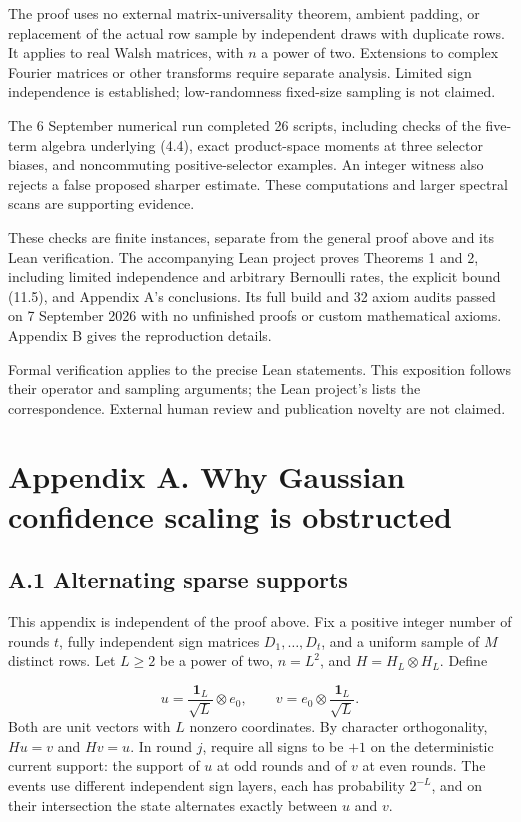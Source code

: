 \documentclass[11pt,a4paper]{article}
\begin{document}
The proof uses no external matrix-universality theorem, ambient padding, or replacement of the actual row sample by independent draws with duplicate rows. It applies to real Walsh matrices, with \(n\) a power of two. Extensions to complex Fourier matrices or other transforms require separate analysis. Limited sign independence is established; low-randomness fixed-size sampling is not claimed.

The 6 September numerical run completed 26 scripts, including checks of the five-term algebra underlying (4.4), exact product-space moments at three selector biases, and noncommuting positive-selector examples. An integer witness also rejects a false proposed sharper estimate. These computations and larger spectral scans are supporting evidence.

These checks are finite instances, separate from the general proof above and its Lean verification. The accompanying Lean project proves Theorems 1 and 2, including limited independence and arbitrary Bernoulli rates, the explicit bound (11.5), and Appendix A's conclusions. Its full build and 32 axiom audits passed on 7 September 2026 with no unfinished proofs or custom mathematical axioms. Appendix B gives the reproduction details.

Formal verification applies to the precise Lean statements. This exposition follows their operator and sampling arguments; the Lean project's  lists the correspondence. External human review and publication novelty are not claimed.

\section*{Appendix A. Why Gaussian confidence scaling is obstructed}
\subsection*{A.1 Alternating sparse supports}
This appendix is independent of the proof above. Fix a positive integer number of rounds \(t\), fully independent sign matrices \(D_1,\ldots,D_t\), and a uniform sample of \(M\) distinct rows. Let \(L\ge2\) be a power of two, \(n=L^2\), and \(H=H_L\otimes H_L\). Define

\begin{equation}
u=\frac{\mathbf1_L}{\sqrt L}\otimes e_0,\qquad
v=e_0\otimes\frac{\mathbf1_L}{\sqrt L}.
\tag{A.1}
\end{equation}
Both are unit vectors with \(L\) nonzero coordinates. By character orthogonality, \(Hu=v\) and \(Hv=u\). In round \(j\), require all signs to be \(+1\) on the deterministic current support: the support of \(u\) at odd rounds and of \(v\) at even rounds. The events use different independent sign layers, each has probability \(2^{-L}\), and on their intersection the state alternates exactly between \(u\) and \(v\).
\end{document}
